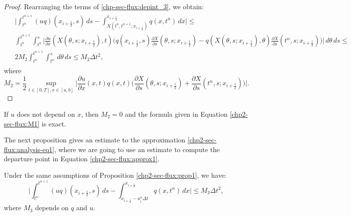 \begin{proof}
Rearranging the terms of \eqref{chp-sec-flux:depint_3}, we obtain:
\begin{align*}
	\label{chp-sec-flux:depint_4}
	\begin{split}
			& \bigg|
			\int_{t^n}^{t^{n+1}} (uq)(x_{i+\frac{1}{2}},s) \,ds -
			\int^{x_{i+\frac{1}{2}}}_{X(t^n,t^{n+1};x_{i+\frac{1}{2}})} q(x,t^n)\,dx 
			\bigg| \leq \\
			& \int_{t^n}^{t^{n+1}} \int_{t^n}^{s} \bigg| 
			\frac{\partial u}{\partial x}(X(\theta,s;x_{i+\frac{1}{2}}),t) \bigg(q(x_{i+\frac{1}{2}},s)
			\frac{\partial X}{\partial s} (\theta,s;x_{i+\frac{1}{2}})- 
			q(X(\theta,s;x_{i+\frac{1}{2}}),\theta) 
			\frac{\partial X}{\partial s} (t^n,s;x_{i+\frac{1}{2}})\bigg)\bigg| \,d\theta \,ds \leq\\
			& 2M_2 \int_{t^n}^{t^{n+1}} \int_{t^n}^{s}  \,d\theta \,ds \leq M_2 \Delta t ^2,
	\end{split}
\end{align*}
where
\begin{equation}
	\label{chp2-sec-flux:M2}
	M_2 = \frac{1}{2} 
			\sup_{t\in[0,T], x\in[a,b]}\bigg| 
			\frac{\partial u}{\partial x}(x,t) 
			q(x,t) \bigg(
			\frac{\partial X}{\partial s} (\theta,s;x_{i+\frac{1}{2}})+
			\frac{\partial X}{\partial s} (t^n,s;x_{i+\frac{1}{2}})\bigg)\bigg|.
\end{equation}
\end{proof}
\begin{remark}
	If $u$ does not depend on $x$, then $M_2=0$ and the formula given in Equation 
	\eqref{chp2-sec-flux:M1} is exact.
\end{remark}
The next proposition gives an estimate to the approximation \eqref{chp2-sec-flux:analysis-eq1},
where we are going to use an estimate to compute the departure point in Equation \eqref{chp2-sec-flux:approx1}.
\begin{prop}
	Under the same assumptions of Proposition \eqref{chp2-sec-flux:prop1}, we have:
	\begin{equation}
	\bigg|
			  \int_{t^n}^{t^{n+1}} (uq)(x_{i+\frac{1}{2}},s) \,ds 
			 -\int^{x_{i+\frac{1}{2}}}_{x_{i+\frac{1}{2}}-u_i^n \Delta t} q(x,t^n)\,dx
	\bigg| \leq M_3 \Delta t^2, 
	\end{equation}
	where $M_3$ depends on $q$ and $u$.
\end{prop}
